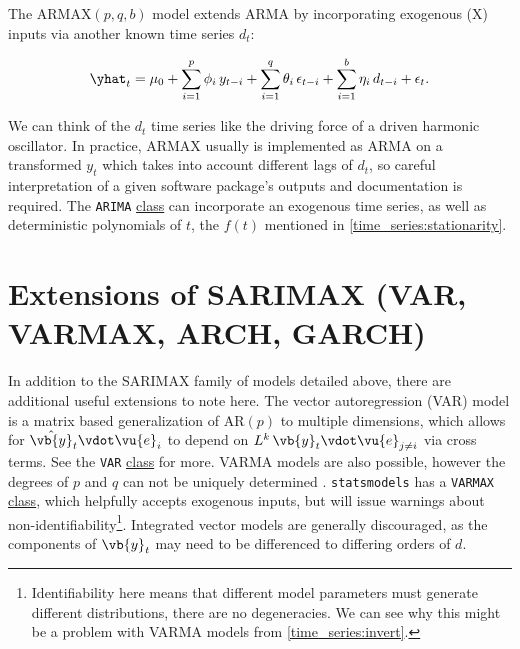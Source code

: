 The $\text{ARMAX}\left(p,q,b\right)$ model
extends ARMA by incorporating exogenous (X) inputs
via another known time series $d_{t}$:

\begin{equation}\label{eq:time_series:ARMAX}
\yhat_{t} = \mu_{0} + \sum_{i=1}^{p} \phi_{i}\, y_{t-i} + \sum_{i=1}^{q} \theta_{i}\, \epsilon_{t-i} + \sum_{i=1}^{b} \eta_{i}\, d_{t-i} + \epsilon_{t}.
\end{equation}

We can think of the $d_{t}$ time series like the driving force of a driven harmonic oscillator.
In practice, ARMAX usually is implemented as ARMA on
a transformed $y_{t}$ which takes into account different lags of $d_{t}$,
so careful interpretation of a given software package's outputs and documentation is required.
The \texttt{ARIMA}
\href{https://www.statsmodels.org/stable/generated/statsmodels.tsa.arima.model.ARIMA.html}{class}
can incorporate an exogenous time series,
as well as deterministic polynomials of $t$,
\ie the $f\left(t\right)$ mentioned in \cref{time_series:stationarity}.

\section{Extensions of SARIMAX (VAR, VARMAX, ARCH, GARCH)}
\label{time_series:SARIMAX_extensions}

In addition to the SARIMAX family of models detailed above,
there are additional useful extensions to note here.
The vector autoregression (VAR) model is a matrix based
generalization of $\text{AR}\left(p\right)$ to multiple dimensions,
which allows for $\hat{\vb{y}}_{t} \vdot \vu{e}_{i}$ to depend on
$L^{k} \, \vb{y}_{t} \vdot \vu{e}_{j \neq i}$ via cross terms.
See the \texttt{VAR}
\href{https://www.statsmodels.org/stable/generated/statsmodels.tsa.vector_ar.var_model.VAR.html}{class} for more.
VARMA models are also possible,
however the degrees of $p$ and $q$ can not be uniquely determined \cite{doi:10.1080/01621459.2021.1942013}.
\texttt{statsmodels} has a \texttt{VARMAX}
\href{https://www.statsmodels.org/stable/generated/statsmodels.tsa.statespace.varmax.VARMAX.html}{class},
which helpfully accepts exogenous inputs,
but will issue warnings about non-identifiability\footnote{
Identifiability here means that different model parameters must generate different distributions,
\ie there are no degeneracies.
We can see why this might be a problem with VARMA models from \cref{time_series:invert}.}.
Integrated vector models are generally discouraged, as the components of $\vb{y}_{t}$
may need to be differenced to differing orders of $d$.

